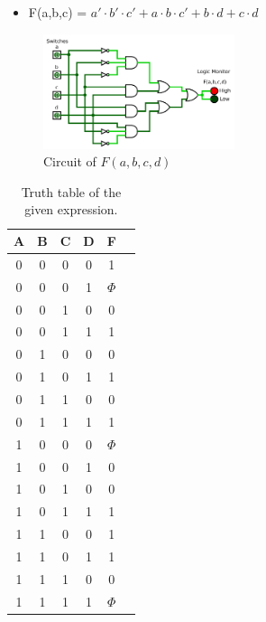 \documentclass[pdftex,12pt,a4paper]{article}
\begin{document}
\begin{flushleft}
\begin{itemize}
    \item F(a,b,c) = $a' \cdot b' \cdot c' + a \cdot b \cdot c' + b \cdot d + c \cdot d$ 
\end{itemize}




\begin{figure}[!h]
	\centering
	\includegraphics[width=0.5\textwidth]{part1.png}	
	\caption{Circuit of $F(a,b,c,d)$}
	\label{fig1}
\end{figure}

\begin{table}[!h]
\begin{center}
    \begin{tabular}{|c|c|c|c|c|c|}
    \hline
         A & B & C & D & F \\
         \hline
         0 & 0 & 0 & 0 & 1 \\
         \hline
         0 & 0 & 0 & 1 & ${\Phi}$ \\
         \hline
         0 & 0 & 1 & 0 & 0 \\
         \hline
         0 & 0 & 1 & 1 & 1 \\
         \hline
         0 & 1 & 0 & 0 & 0 \\
         \hline
         0 & 1 & 0 & 1 & 1 \\
         \hline
         0 & 1 & 1 & 0 & 0 \\
         \hline
         0 & 1 & 1 & 1 & 1 \\
         \hline
         1 & 0 & 0 & 0 & ${\Phi}$ \\
         \hline
         1 & 0 & 0 & 1 & 0 \\
         \hline
         1 & 0 & 1 & 0 & 0 \\
         \hline
         1 & 0 & 1 & 1 & 1 \\
         \hline
         1 & 1 & 0 & 0 & 1 \\
         \hline
         1 & 1 & 0 & 1 & 1 \\
         \hline
         1 & 1 & 1 & 0 & 0 \\
         \hline
         1 & 1 & 1 & 1 & ${\Phi}$ \\
         \hline
    \hline
    \end{tabular}
    \caption{Truth table of the given expression.}
    \label{truthtablep1}
\end{center}
\end{table}


\end{flushleft}
\end{document}
